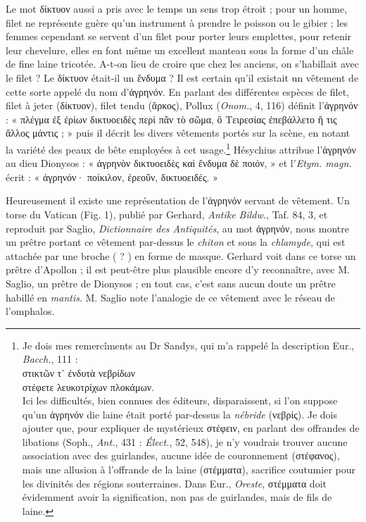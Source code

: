 \documentclass[a4paper, 11pt, oneside, polutonikogreek, french]{article}
\begin{document}
Le mot δίκτυον aussi a pris avec le temps un sens trop étroit ; pour un homme, filet ne représente guère qu'un instrument à prendre le poisson ou le gibier ; les femmes cependant se servent d'un filet pour porter leurs emplettes, pour retenir leur chevelure, elles en font même un excellent manteau sous la forme d'un châle de fine laine tricotée. A-t-on lieu de croire que chez les anciens, on s'habillait avec le filet ? Le δίκτυον était-il un ἔνδυμα ? Il est certain qu'il existait un vêtement de cette sorte appelé du nom d'ἀγρηνόν. En parlant des différentes espèces de filet, filet à jeter (δίκτυον), filet tendu (ἄρκος), Pollux (\emph{Onom.}, 4, 116) définit l'ἀγρηνόν : « πλέγμα ἐξ ἐρίων δικτυοειδὲς περὶ πᾶν τὸ σῶμα, ὃ Τειρεσίας ἐπεβάλλετο ἤ τις ἄλλος μάντις ; » puis il décrit les divers vêtements portés sur la scène, en notant la variété des peaux de bête employées à cet usage.\footnote{Je dois mes remercîments au Dr Sandys, qui m'a rappelé la description Eur., \emph{Bacch.}, 111 :\\\hspace*{10mm}στικτῶν τ᾽ ἐνδυτὰ νεβρίδων\\\hspace*{10mm}στέφετε λευκοτρίχων πλοκάμων.\\\hspace*{10mm}Ici les difficultés, bien connues des éditeurs, disparaissent, si l'on suppose qu'un ἀγρηνόν die laine était porté par-dessus la \emph{nébride} (νεβρίς). Je dois ajouter que, pour expliquer de mystérieux στέφειν, en parlant des offrandes de libations (Soph., \emph{Ant.}, 431 : \emph{Élect.}, 52, 548), je n'y voudrais trouver aucune association avec des guirlandes, aucune idée de couronnement (στέφανος), mais une allusion à l'offrande de la laine (στέμματα), sacrifice coutumier pour les divinités des régions souterraines. Dans Eur., \emph{Oreste}, στέμματα doit évidemment avoir la signification, non pas de guirlandes, mais de fils de laine.} Hésychius attribue l'ἀγρηνόν au dieu Dionysos : « ἀγρηνὸν δικτυοειδὲς καὶ ἔνδυμα δὲ ποιόν, » et l'\emph{Etym. magn.} écrit : « ἀγρηνόν· ποίκιλον, ἐρεοῦν, δικτυοειδές. »

Heureusement il existe une représentation de l'ἀγρηνόν servant de vêtement. Un torse du Vatican (Fig. 1), publié par Gerhard, \emph{Antike Bildw.}, Taf. 84, 3, et reproduit par Saglio, \emph{Dictionnaire des Antiquités}, au mot ἀγρηνόν, nous montre un prêtre portant ce vêtement par-dessus le \emph{chiton} et sous la \emph{chlamyde}, qui est attachée par une broche ( ? ) en forme de masque. Gerhard voit dans ce torse un prêtre d'Apollon ; il est peut-être plus plausible encore d'y reconnaître, avec M. Saglio, un prêtre de Dionysos ; en tout cas, c'est sans aucun doute un prêtre habillé en \emph{mantis}. M. Saglio note l'analogie de ce vêtement avec le réseau de l'omphalos.
\end{document}
